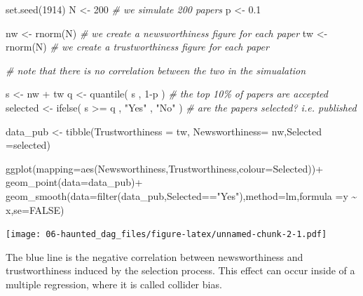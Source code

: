 \documentclass[
]{book}
\newenvironment{Shaded}{\begin{snugshade}}{\end{snugshade}}
\newcommand{\AttributeTok}[1]{\textcolor[rgb]{0.77,0.63,0.00}{#1}}
\newcommand{\CommentTok}[1]{\textcolor[rgb]{0.56,0.35,0.01}{\textit{#1}}}
\newcommand{\ConstantTok}[1]{\textcolor[rgb]{0.00,0.00,0.00}{#1}}
\newcommand{\DecValTok}[1]{\textcolor[rgb]{0.00,0.00,0.81}{#1}}
\newcommand{\FloatTok}[1]{\textcolor[rgb]{0.00,0.00,0.81}{#1}}
\newcommand{\FunctionTok}[1]{\textcolor[rgb]{0.00,0.00,0.00}{#1}}
\newcommand{\NormalTok}[1]{#1}
\newcommand{\OtherTok}[1]{\textcolor[rgb]{0.56,0.35,0.01}{#1}}
\newcommand{\SpecialCharTok}[1]{\textcolor[rgb]{0.00,0.00,0.00}{#1}}
\newcommand{\StringTok}[1]{\textcolor[rgb]{0.31,0.60,0.02}{#1}}
\begin{document}
\begin{Shaded}
\begin{Highlighting}[]
\FunctionTok{set.seed}\NormalTok{(}\DecValTok{1914}\NormalTok{) }
\NormalTok{N }\OtherTok{\textless{}{-}} \DecValTok{200} \CommentTok{\# we simulate 200 papers}
\NormalTok{p }\OtherTok{\textless{}{-}} \FloatTok{0.1} 

\NormalTok{nw }\OtherTok{\textless{}{-}} \FunctionTok{rnorm}\NormalTok{(N) }\CommentTok{\# we create a newsworthiness figure for each paper}
\NormalTok{tw }\OtherTok{\textless{}{-}} \FunctionTok{rnorm}\NormalTok{(N) }\CommentTok{\# we create a trustworthiness figure for each paper}

\CommentTok{\# note that there is no correlation between the two in the simualation}

\NormalTok{s }\OtherTok{\textless{}{-}}\NormalTok{ nw }\SpecialCharTok{+}\NormalTok{ tw }
\NormalTok{q }\OtherTok{\textless{}{-}} \FunctionTok{quantile}\NormalTok{( s , }\DecValTok{1}\SpecialCharTok{{-}}\NormalTok{p ) }\CommentTok{\# the top 10\% of papers are accepted}
\NormalTok{selected }\OtherTok{\textless{}{-}} \FunctionTok{ifelse}\NormalTok{( s }\SpecialCharTok{\textgreater{}=}\NormalTok{ q , }\StringTok{"Yes"}\NormalTok{ , }\StringTok{"No"}\NormalTok{ ) }\CommentTok{\# are the papers selected? i.e. published}


\NormalTok{data\_pub }\OtherTok{\textless{}{-}} \FunctionTok{tibble}\NormalTok{(}\AttributeTok{Trustworthiness =}\NormalTok{ tw, }\AttributeTok{Newsworthiness=}\NormalTok{ nw,}\AttributeTok{Selected =}\NormalTok{selected)}

\FunctionTok{ggplot}\NormalTok{(}\AttributeTok{mapping=}\FunctionTok{aes}\NormalTok{(Newsworthiness,Trustworthiness,}\AttributeTok{colour=}\NormalTok{Selected))}\SpecialCharTok{+}
  \FunctionTok{geom\_point}\NormalTok{(}\AttributeTok{data=}\NormalTok{data\_pub)}\SpecialCharTok{+}
    \FunctionTok{geom\_smooth}\NormalTok{(}\AttributeTok{data=}\FunctionTok{filter}\NormalTok{(data\_pub,Selected}\SpecialCharTok{==}\StringTok{"Yes"}\NormalTok{),}\AttributeTok{method=}\NormalTok{lm,}\AttributeTok{formula =}\StringTok{\textquotesingle{}y \textasciitilde{} x\textquotesingle{}}\NormalTok{,}\AttributeTok{se=}\ConstantTok{FALSE}\NormalTok{)}
\end{Highlighting}
\end{Shaded}

\texttt{[image: 06-haunted\_dag\_files/figure-latex/unnamed-chunk-2-1.pdf]}

The blue line is the negative correlation between newsworthiness and trustworthiness induced by the selection process. This effect can occur inside of a multiple regression, where it is called collider bias.
\end{document}
